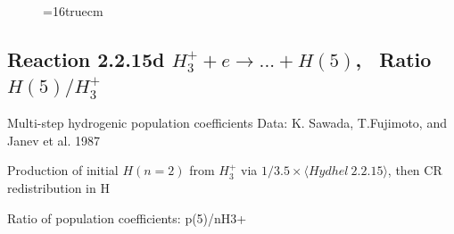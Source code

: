 \documentclass[12pt,dvipdfmx]{article}
\begin{document}
\begin{small}
\begin{verbatim}
\end{verbatim}\end{small}
\begin{figure} \label{2.2.15c}
\epsfxsize=16truecm
\end{figure}
\newpage

\subsection{
Reaction 2.2.15d $ H_3^+ + e \rightarrow ...+ H(5) $, \   Ratio $H(5)/H_3^+  $
}

 Multi-step hydrogenic population coefficients
 Data: K. Sawada, T.Fujimoto, \cite{kn:Sawada} and Janev et al. 1987

 Production of initial $H(n=2)$ from $H_3^+$ via $1/3.5 \times \langle Hydhel~ 2.2.15\rangle$,
 then CR redistribution in H

 Ratio of population coefficients: p(5)/nH3+
\end{document}
